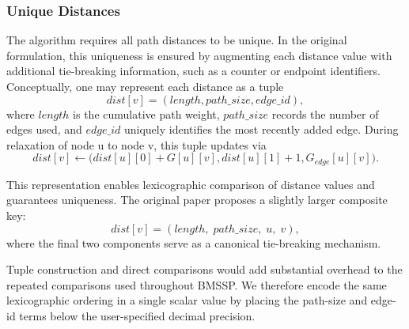 \documentclass[ijoc,blindrev]{informs3} %
\begin{document}
\subsubsection{Unique Distances}\label{sec:unique_distances}
The algorithm requires all path distances to be unique. In the original formulation, this uniqueness is ensured by augmenting each distance value with additional tie-breaking information, such as a counter or endpoint identifiers. Conceptually, one may represent each distance as a tuple
\[
\mathit{dist}[v] = (\mathit{length}, \mathit{path\_size}, \mathit{edge\_id}),
\]
where $\mathit{length}$ is the cumulative path weight, $\mathit{path\_size}$ records the number of edges used, and $\mathit{edge\_id}$ uniquely identifies the most recently added edge. During relaxation {\color{blue} of node u to node v}, this tuple updates via
\[
\mathit{dist}[v] \leftarrow \big(\mathit{dist}[u][0] + G[u][v], \mathit{dist}[u][1] + 1, G_{\mathit{edge}}[u][v]\big).
\]

This representation enables lexicographic comparison of distance values and guarantees uniqueness. The original paper proposes a slightly larger composite key:
\[
\mathit{dist}[v] = (\mathit{length},\; \mathit{path\_size},\; u,\; v),
\]
where the final two components serve as a canonical tie-breaking mechanism.


Tuple construction and direct comparisons would add substantial overhead to the repeated comparisons used throughout BMSSP. We therefore encode the same lexicographic ordering in a single scalar value by placing the path-size and edge-id terms below the user-specified decimal precision.
\end{document}
